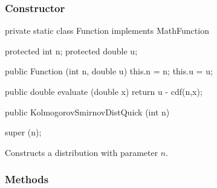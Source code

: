 \subsubsection* {Constructor}

\begin{code}\begin{hide}

   private static class Function implements MathFunction {
      protected int n;
      protected double u;

      public Function (int n, double u) {
         this.n = n;
         this.u = u;
      }

      public double evaluate (double x) {
         return u - cdf(n,x);
      }
   }\end{hide}

   public KolmogorovSmirnovDistQuick (int n)\begin{hide} {
      super (n);
   }\end{hide}
\end{code}
\begin{tabb}
   Constructs a \ks{} distribution with parameter $n$.
\end{tabb}

\subsubsection* {Methods}

